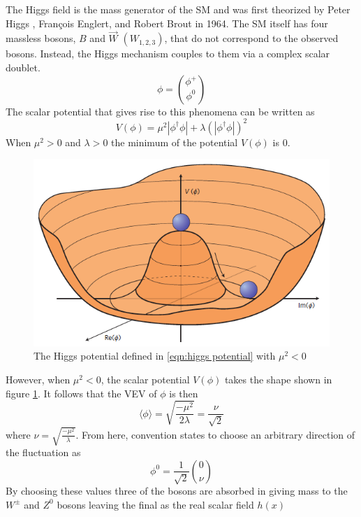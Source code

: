 		The Higgs field is the mass generator of the \gls{SM} and was first theorized by Peter Higgs \cite{Higgs-paper}, François Englert, and Robert Brout \cite{Englert-Brout} in 1964.  The \gls{SM} itself has four massless bosons, $B$ and $\vec{W}$ $(W_{1,2,3})$, that do not correspond to the observed bosons. Instead, the Higgs mechanism couples to them via a complex scalar doublet. 
		\begin{equation}\label{eqn:scal doub} \phi = \binom{\phi^+}{\phi^0}\end{equation}
		The scalar potential that gives rise to this phenomena can be written as 
		\begin{equation}\label{eqn:higgs potential} V(\phi) = \mu^2 |\phi^{\dagger}\phi| + \lambda (|\phi^{\dagger}\phi|)^2\end{equation}
		When $\mu^2>0$ and $\lambda>0$ the minimum of the potential $V(\phi)$ is 0. 
		\begin{figure}[!ht] \centering \includegraphics[width=.7\textwidth,keepaspectratio=true]{chapters/chapter2_theory/images/higgspotential.png} \caption{The Higgs potential defined in \ref{eqn:higgs potential} with $\mu^2<0$ \cite{Higgs-phys}} \label{fig:higgs-potential}\end{figure}
		However, when $\mu^2<0$, the scalar potential $V(\phi)$ takes the shape shown in figure \ref{fig:higgs-potential}.
		It follows that the \gls{VEV} of $\phi$ is then 
		\begin{equation}\label{eqn:higgs vev} \langle \phi \rangle = \sqrt{\frac{-\mu^2}{2\lambda}} = \frac{\nu}{\sqrt{2}}	\end{equation}
		where $\nu = \sqrt{\frac{-\mu^2}{\lambda}}$.
		From here, convention states to choose an arbitrary direction of the fluctuation as 
		\begin{equation}\label{eqn:phi zero} \phi^0 = \frac{1}{\sqrt{2}} \binom{0}{\nu} \end{equation}
		By choosing these values three of the bosons are absorbed in giving mass to the $W^{\pm}$ and $Z^0$ bosons leaving the final as the real scalar field $h(x)$

